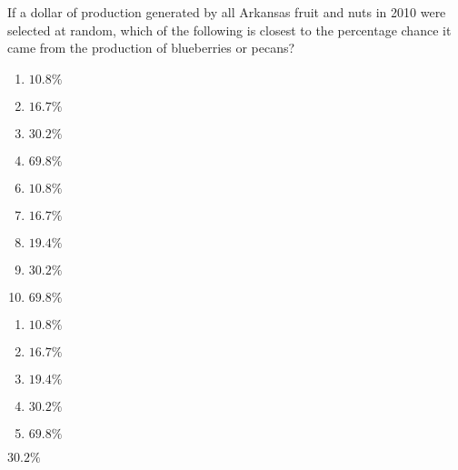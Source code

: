  
If a dollar of production generated by all Arkansas fruit and nuts in 2010 were selected at random, which of the following is closest to the percentage chance it came from the production of blueberries or pecans?


\ifsat
	\begin{enumerate}[label=\Alph*)]
		\item $10.8\% $ 
		\item $16.7\% $ 
		\item $30.2\% $ %
		\item $69.8\% $
	\end{enumerate}
\else
\fi

\ifacteven
	\begin{enumerate}[label=\textbf{\Alph*.},itemsep=\fill,align=left]
		\setcounter{enumii}{5}
		\item $10.8\% $ 
		\item $16.7\% $ 
		\item $19.4\% $ 
		\addtocounter{enumii}{1}
		\item $30.2\% $ %
		\item $69.8\% $
	\end{enumerate}
\else
\fi

\ifactodd
	\begin{enumerate}[label=\textbf{\Alph*.},itemsep=\fill,align=left]
		\item $10.8\% $ 
		\item $16.7\% $ 
		\item $19.4\% $ 
		\item $30.2\% $ %
		\item $69.8\% $
	\end{enumerate}
\else
\fi

\ifgridin
 $30.2\% $ %
		
\else
\fi

